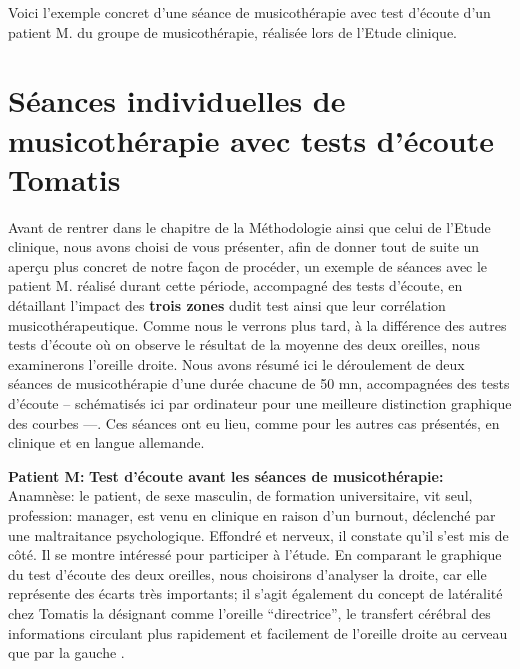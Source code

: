 Voici l'exemple concret d'une  séance de
musicothérapie  avec test d'écoute  d'un 
patient M. du groupe de musicothérapie, réalisée lors de l'Etude clinique.

 \clearpage



\section{ Séances individuelles  de musicothérapie avec tests d'écoute Tomatis}

Avant de rentrer dans le chapitre de la Méthodologie ainsi que celui de l'Etude clinique, nous avons 
choisi de vous présenter,  afin de donner tout de suite un aperçu plus concret  de notre façon de 
procéder, un exemple de 
séances avec le 
patient M. réalisé durant cette 
période, accompagné des tests d'écoute, en détaillant 
l'impact
des\textbf{ trois zones} dudit test ainsi que  leur corrélation musicothérapeutique. Comme nous le 
verrons plus tard, à la différence des 
autres tests d'écoute où on observe le résultat de la moyenne des deux oreilles, nous examinerons 
l'oreille droite.
Nous avons résumé ici le déroulement de deux séances de
musicothérapie d'une durée chacune  de 50 mn,  accompagnées des tests d'écoute --  
schématisés ici  par ordinateur pour une meilleure 
distinction graphique des courbes ---. Ces séances ont eu lieu, comme pour les autres cas 
présentés, en clinique et en langue allemande.

\textbf{Patient M:}
\textbf{ Test d'écoute avant les séances de musicothérapie:}
Anamnèse: le patient, %
 de sexe masculin, de formation universitaire, vit seul, profession: 
manager,  est venu en clinique en raison d'un 
burnout, déclenché par 
une maltraitance psychologique. Effondré et nerveux, il constate qu'il s'est mis de côté. Il se montre
intéressé pour participer à l'étude. En comparant le graphique du test d'écoute des deux oreilles, nous 
choisirons d'analyser la droite, car elle représente des écarts très 
importants; 
il s'agit également du concept de latéralité chez Tomatis la désignant comme l'oreille ``directrice'', le 
transfert cérébral des informations circulant plus rapidement et facilement  de l'oreille droite au cerveau  
que par la gauche \autocite {Tomatislangage}.


